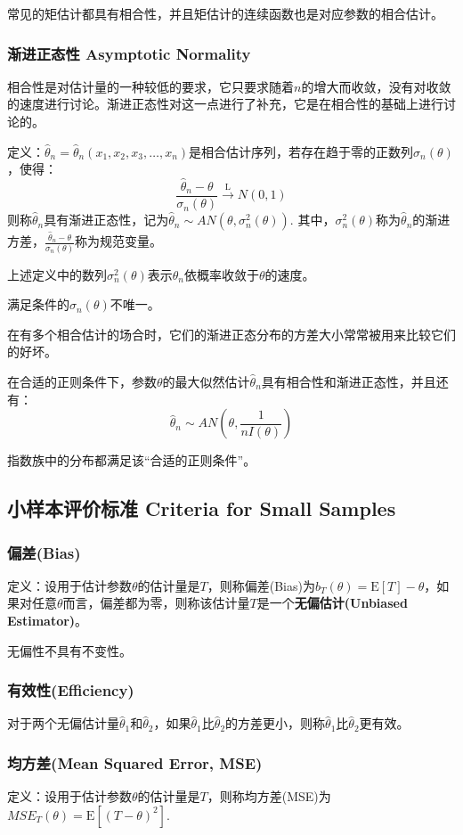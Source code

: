 \documentclass[UTF8]{ctexbook}
\begin{document}
常见的矩估计都具有相合性，并且矩估计的连续函数也是对应参数的相合估计。
\subsubsection{渐进正态性 Asymptotic Normality}
相合性是对估计量的一种较低的要求，它只要求随着$n$的增大而收敛，没有对收敛的速度进行讨论。渐进正态性对这一点进行了补充，它是在相合性的基础上进行讨论的。

定义：$\hat\theta_n=\hat\theta_n(x_1,x_2,x_3,\dots,x_n)$是相合估计序列，若存在趋于零的正数列$\sigma_n(\theta)$，使得：
\[
	\frac{\hat\theta_n-\theta}{\sigma_n(\theta)}\xrightarrow{\mathrm{L}}N(0,1)
\]
则称$\hat\theta_n$具有渐进正态性，记为$\hat\theta_n\sim AN(\theta,\sigma_n^2(\theta))$. 其中，$\sigma_n^2(\theta)$称为$\hat\theta_n$的渐进方差，$\frac{\hat\theta_n-\theta}{\sigma_n(\theta)}$称为规范变量。

上述定义中的数列$\sigma_n^2(\theta)$表示$\hat\theta_n$依概率收敛于$\theta$的速度。

满足条件的$\sigma_n(\theta)$不唯一。

在有多个相合估计的场合时，它们的渐进正态分布的方差大小常常被用来比较它们的好坏。

在合适的正则条件下，参数$\theta$的最大似然估计$\hat\theta_n$具有相合性和渐进正态性，并且还有：
\[
	\hat\theta_n\sim AN\left(\theta,\frac{1}{nI(\theta)}\right)
\]

指数族中的分布都满足该“合适的正则条件”。
\subsection{小样本评价标准 Criteria for Small Samples}
\subsubsection{偏差(Bias)}
定义：设用于估计参数$\theta$的估计量是$T$，则称偏差(Bias)为$b_T(\theta)=\mathrm E[T]-\theta$，如果对任意$\theta$而言，偏差都为零，则称该估计量$T$是一个\textbf{无偏估计(Unbiased Estimator)}。

无偏性不具有不变性。
\subsubsection{有效性(Efficiency)}
对于两个无偏估计量$\hat\theta_1$和$\hat\theta_2$，如果$\hat\theta_1$比$\hat\theta_2$的方差更小，则称$\hat\theta_1$比$\hat\theta_2$更有效。
\subsubsection{均方差(Mean Squared Error, MSE)}
定义：设用于估计参数$\theta$的估计量是$T$，则称均方差(MSE)为$MSE_T(\theta)=\mathrm{E}[(T-\theta)^2]$.
\end{document}
